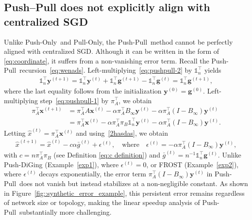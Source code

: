 \documentclass[10pt]{article}
\newcommand{\one}{\mathds{1}_n}
\newcommand{\vg}{{\mathbf{g}}}
\newcommand{\vx}{{\mathbf{x}}}
\newcommand{\vy}{{\mathbf{y}}}
\newcommand{\pushonly}{{\sc Push-Only}\xspace}
\newcommand{\pushpull}{{\sc Push-Pull}\xspace}
\newcommand{\pullonly}{{\sc Pull-Only}\xspace}
\begin{document}
\vspace{1mm}
\subsection{Push--Pull does not explicitly align with centralized SGD}
Unlike \pushonly\ and \pullonly, the \pushpull\ method cannot be perfectly aligned with centralized SGD. Although it can be written in the form of \eqref{eq:coordinate}, it suffers from a non-vanishing error term. Recall the \pushpull\ recursion~\eqref{eq:wenads}. Left-multiplying~\eqref{eq:pushpull-2} by $\one^\top$ yields
\begin{align}\label{2hasdas}
\one^\top \vy^{(t+1)} = \one^\top \vy^{(t)} + \one^\top \vg^{(t+1)} - \one^\top \vg^{(t)} = \one^\top \vg^{(t+1)},
\end{align}
where the last equality follows from the initialization $\vy^{(0)}=\vg^{(0)}$. Left-multiplying step~\eqref{eq:pushpull-1} by $\pi_A^\top$, we obtain
\begin{align*}
    \pi_A^\top \vx^{(t+1)} &= \pi_A^\top A\vx^{(t)} - \alpha \pi_A^\top B_\infty \vy^{(t)} - \alpha \pi_A^\top(I-B_\infty)\vy^{(t)} \\
    &= \pi_A^\top \vx^{(t)} - \alpha \pi_A^\top \pi_B \one^\top \vy^{(t)} - \alpha \pi_A^\top(I-B_\infty)\vy^{(t)}.
\end{align*}
Letting $\hat{x}^{(t)} = \pi_A^\top\vx^{(t)}$ and using~\eqref{2hasdas}, we obtain
\begin{align}\label{eq:push-pull-centralized}
\hat{x}^{(t+1)} = \hat{x}^{(t)} - c\alpha \bar{g}^{(t)} + \epsilon^{(t)}, 
\quad \text{where} \quad \epsilon^{(t)} = -\alpha \pi_A^\top(I-B_\infty)\vy^{(t)},
\end{align}
with $c=n\pi_A^\top\pi_B$ (see Definition \eqref{eq:c definition}) and $\bar{g}^{(t)} = n^{-1}\one^\top\vg^{(t)}$. Unlike Push-DiGing (Example~\ref{exp1}), where $\epsilon^{(t)}=0$, or FROST (Example~\ref{exp2}), where $\epsilon^{(t)}$ decays exponentially, the error term $\pi_A^\top(I-B_\infty)\vy^{(t)}$ in \pushpull\ does not vanish but instead stabilizes at a non-negligible constant. As shown in Figure~\ref{fig::synthetic_error_example}, this persistent error remains regardless of network size or topology, making the linear speedup analysis of \pushpull\ substantially more challenging.
\end{document}
